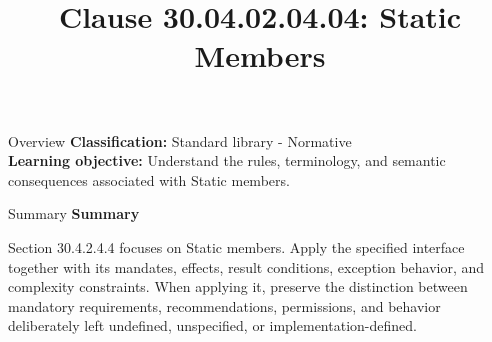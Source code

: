 \documentclass[10pt,letterpaper]{article}
\title{Clause 30.04.02.04.04: Static Members}
\author{}
\date{}
\begin{document}
\maketitle
\begin{CornellOverviewBox}{Overview}
\textbf{Classification:} Standard library - Normative\\[2pt]
\textbf{Learning objective:} Understand the rules, terminology, and semantic consequences associated with Static members.
\end{CornellOverviewBox}\begin{CornellSummaryBox}{Summary}
{\sffamily\bfseries\color{Accent} Summary}\par\vspace{3pt}Section 30.4.2.4.4 focuses on Static members. Apply the specified interface together with its mandates, effects, result conditions, exception behavior, and complexity constraints. When applying it, preserve the distinction between mandatory requirements, recommendations, permissions, and behavior deliberately left undefined, unspecified, or implementation-defined.
\end{CornellSummaryBox}
\end{document}
